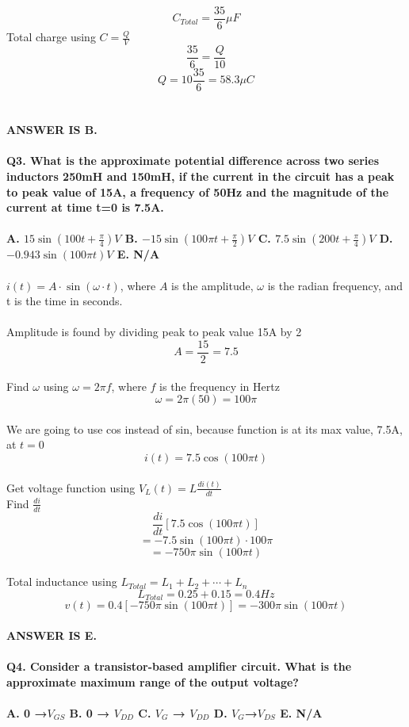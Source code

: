 \documentclass[12pt]{article}
\begin{document}
\[C_{Total} = \frac{35}{6}\mu F\]
Total charge using \(C = \frac{Q}{V}\)\\
\[\frac{35}{6} = \frac{Q}{10}\]
\[Q = 10\frac{35}{6} = 58.3\mu C\]\\
\\
\textbf{ANSWER IS B.}\\
\\
\textbf{Q3. What is the approximate potential difference across two series inductors 250mH and 150mH, if the current in the circuit has a peak to peak value of 15A, a frequency of 50Hz and the magnitude of the current at time t=0 is 7.5A.\\
\\
A. \(15\sin(100t + \frac{\pi}{4})V\) B. \(-15\sin(100\pi t + \frac{\pi}{2})V\) C. \(7.5\sin(200t + \frac{\pi}{4})V\) D. \(-0.943\sin(100\pi t)V\) E. N/A}\\
\\
\(i(t) = A \cdot \sin(\omega \cdot t)\), where \(A\) is the amplitude, \(\omega\) is the radian frequency, and t is the time in seconds.\\
\\
Amplitude is found by dividing peak to peak value 15A by 2\\
\[A = \frac{15}{2} = 7.5\]\\
Find \(\omega\) using \(\omega = 2\pi f\), where \(f\) is the frequency in Hertz\\
\[\omega = 2\pi (50) = 100\pi\]\\
We are going to use cos instead of sin, because function is at its max value, 7.5A, at \(t = 0\)\\
\[i(t) = 7.5\cos(100\pi t)\]\\
Get voltage function using \(V_L(t) = L\frac{di(t)}{dt}\)\\
Find \(\frac{di}{dt}\)\\
\[\frac{di}{dt}[7.5\cos(100\pi t)]\]
\[= -7.5\sin(100\pi t) \cdot 100\pi\]
\[= -750\pi \sin(100\pi t)\]\\
Total inductance using \(L_{Total} = L_1 + L_2 + \cdots + L_n\)\\
\[L_{Total} = 0.25 + 0.15 = 0.4 Hz\]
\[v(t) = 0.4[-750\pi \sin(100\pi t)] = -300\pi \sin(100\pi t)\]\\
\textbf{ANSWER IS E.}\\
\\
\textbf{Q4. Consider a transistor-based amplifier circuit. What is the approximate maximum range of the output voltage?\\
\\
A. 0 →\(V_{GS}\) B. 0 → \(V_{DD}\) C. \(V_G\) → \(V_{DD}\) D. \(V_G\)→\(V_{DS}\) E. N/A}\\
\end{document}
